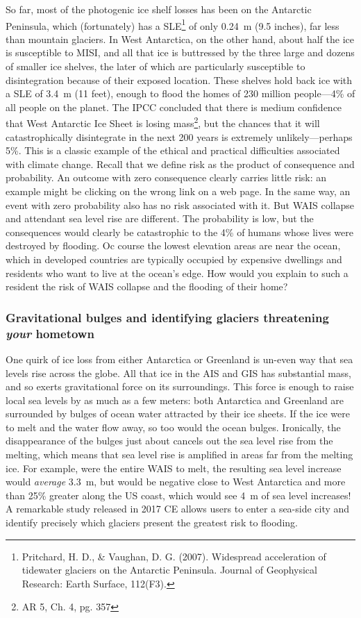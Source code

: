 So far, most of the photogenic ice shelf losses has been on the Antarctic Peninsula, which (fortunately) has a SLE\footnote{Pritchard, H. D., \& Vaughan, D. G. (2007). Widespread acceleration of tidewater glaciers on the Antarctic Peninsula. Journal of Geophysical Research: Earth Surface, 112(F3).} of only \SI{0.24}{\metre} (9.5 inches), far less than mountain glaciers. In West Antarctica, on the other hand,  about half the ice is susceptible to MISI, and all that ice is buttressed by the three large and dozens of smaller ice shelves, the later of which are particularly susceptible to disintegration because of their exposed location. These shelves hold back ice with a SLE of \SI{3.4}{\metre} (11 feet), enough to flood the homes of 230 million people---4\% of all people on the planet. The IPCC concluded that there is medium confidence that West Antarctic Ice Sheet is losing mass\footnote{AR 5, Ch. 4, pg. 357}, but the chances that it will catastrophically disintegrate in the next 200 years is extremely unlikely---perhaps 5\%. This is a classic example of the ethical and practical difficulties associated with climate change. Recall that we define risk as the product of consequence and probability. An outcome with zero consequence clearly carries little risk: an example might be clicking on the wrong link on a web page. In the same way, an event with zero probability also has no risk associated with it. But WAIS collapse and attendant sea level rise are different. The probability is low, but the consequences would clearly be catastrophic to the 4\% of humans whose lives were destroyed by flooding. Oc course the lowest elevation areas are near the ocean, which in developed countries are typically occupied by expensive dwellings and residents who want to live at the ocean's edge. How would you explain to such a resident the risk of WAIS collapse and the flooding of their home?\\
\subsubsection{Gravitational bulges and identifying glaciers threatening \emph{your} hometown} One quirk of ice loss from either Antarctica or Greenland is un-even way that sea levels rise across the globe. All that ice in the AIS and GIS has substantial mass, and so exerts gravitational force on its surroundings. This force is enough to raise local sea levels by as much as a few meters: both Antarctica and Greenland are surrounded by bulges of ocean water attracted by their ice sheets. If the ice were to melt and the water flow away, so too would the ocean bulges. Ironically, the disappearance of the bulges just about cancels out the  sea level rise from the melting, which means that sea level rise is amplified in areas far from the melting ice. For example, were the entire WAIS to melt, the resulting sea level increase would \emph{average} \SI{3.3}{\metre}, but would be negative close to West Antarctica and more than 25\% greater along the US coast, which would see \SI{4}{\metre} of sea level increases! A remarkable study released in 2017 CE allows users to enter a sea-side city and identify precisely which glaciers present the greatest risk to flooding. 
      



